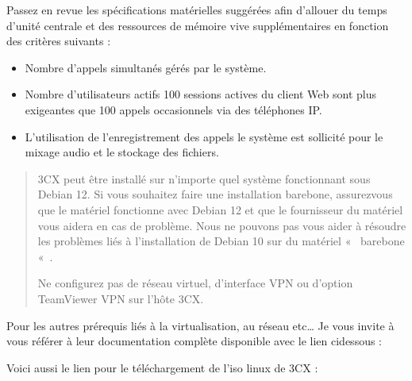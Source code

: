 \documentclass[letterpaper,10pt,french]{sphinxmanual}
\begin{document}
\sphinxAtStartPar
Passez en revue les spécifications matérielles suggérées afin d’allouer du temps d’unité centrale et des ressources de mémoire vive supplémentaires en fonction des critères suivants :
\begin{itemize}
\item {} 
\sphinxAtStartPar
Nombre d’appels simultanés gérés par le système.

\item {} 
\sphinxAtStartPar
Nombre d’utilisateurs actifs \sphinxhyphen{} 100 sessions actives du client Web sont plus exigeantes que 100 appels occasionnels via des téléphones IP.

\item {} 
\sphinxAtStartPar
L’utilisation de l’enregistrement des appels \sphinxhyphen{} le système est sollicité pour le mixage audio et le stockage des fichiers.

\end{itemize}
\begin{quote}

\sphinxAtStartPar
3CX peut être installé sur n’importe quel système fonctionnant sous Debian 12. Si vous souhaitez faire une installation barebone, assurez\sphinxhyphen{}vous que le matériel fonctionne avec Debian 12 et que le fournisseur du matériel vous aidera en cas de problème. Nous ne pouvons pas vous aider à résoudre les problèmes liés à l’installation de Debian 10 sur du matériel «  barebone « .

\sphinxAtStartPar
Ne configurez pas de réseau virtuel, d’interface VPN ou d’option TeamViewer VPN sur l’hôte 3CX.
\end{quote}

\sphinxAtStartPar
Pour les autres prérequis liés à la virtualisation, au réseau etc… Je vous invite à vous référer à leur documentation complète disponible avec le lien ci\sphinxhyphen{}dessous :

\sphinxAtStartPar
{}

\sphinxAtStartPar
Voici aussi le lien pour le téléchargement de l’iso linux de 3CX :

\sphinxAtStartPar
{}

\sphinxAtStartPar


\sphinxAtStartPar
{}
\end{document}
